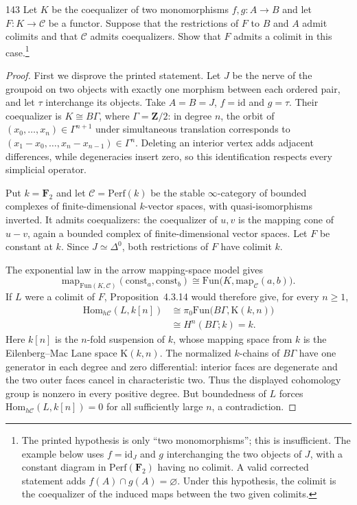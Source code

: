 \begin{exercise}{143}
Let $K$ be the coequalizer of two monomorphisms $f,g\colon A\to B$ and let
$F\colon K\to\mathcal C$ be a functor. Suppose that the restrictions of $F$ to $B$ and $A$ admit colimits
and that $\mathcal C$ admits coequalizers. Show that $F$ admits a colimit in this case.\footnote{The printed
hypothesis is only ``two monomorphisms''; this is insufficient. The example below
uses $f=\mathrm{id}_J$ and $g$ interchanging the two objects of $J$, with a constant
diagram in $\mathrm{Perf}(\mathbf F_2)$ having no colimit. A valid corrected statement
adds $f(A)\cap g(A)=\varnothing$. Under this hypothesis, the colimit is the
coequalizer of the induced maps between the two given colimits.}

\begin{proof}
First we disprove the printed statement.
Let $J$ be the nerve of the groupoid on two objects with exactly one
morphism between each ordered pair, and let $\tau$ interchange its objects.
Take $A=B=J$, $f=\mathrm{id}$ and $g=\tau$.
Their coequalizer is $K\cong B\Gamma$, where $\Gamma=\mathbf Z/2$:
in degree $n$, the orbit of $(x_0,\ldots,x_n)\in\Gamma^{n+1}$
under simultaneous translation corresponds to
$(x_1-x_0,\ldots,x_n-x_{n-1})\in\Gamma^n$.
Deleting an interior vertex adds adjacent differences, while degeneracies
insert zero, so this identification respects every simplicial operator.

Put $k=\mathbf F_2$ and let $\mathcal C=\mathrm{Perf}(k)$ be the
stable $\infty$-category of bounded complexes of finite-dimensional
$k$-vector spaces, with quasi-isomorphisms inverted.
It admits coequalizers: the coequalizer of $u,v$ is the mapping cone of
$u-v$, again a bounded complex of finite-dimensional vector spaces.
Let $F$ be constant at $k$. Since $J\simeq\Delta^0$, both restrictions
of $F$ have colimit $k$.

The exponential law in the arrow mapping-space model gives
\[
 \mathrm{map}_{\mathrm{Fun}(K,\mathcal C)}
       (\mathrm{const}_a,\mathrm{const}_b)
 \cong\mathrm{Fun}\bigl(K,\mathrm{map}_{\mathcal C}(a,b)\bigr).
\]
If $L$ were a colimit of $F$, Proposition~4.3.14 would therefore give,
for every $n\geq1$,
\[
 \begin{aligned}
 \mathrm{Hom}_{h\mathcal C}(L,k[n])
   &\cong\pi_0\mathrm{Fun}\bigl(B\Gamma,\mathrm K(k,n)\bigr)\\
   &\cong H^n(B\Gamma;k)=k.
 \end{aligned}
\]
Here $k[n]$ is the $n$-fold suspension of $k$, whose mapping space
from $k$ is the Eilenberg--Mac Lane space $\mathrm K(k,n)$.
The normalized $k$-chains of $B\Gamma$ have one generator in each
degree and zero differential: interior faces are degenerate and the two
outer faces cancel in characteristic two.
Thus the displayed cohomology group is nonzero in every positive degree.
But boundedness of $L$ forces
$\mathrm{Hom}_{h\mathcal C}(L,k[n])=0$ for all sufficiently large $n$,
a contradiction.


\end{proof}
\end{exercise}
